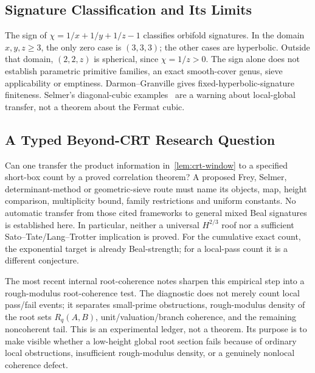 \documentclass[11pt,a4paper]{article}
\begin{document}
\subsection{Signature Classification and Its Limits}
\label{sec:outlook-phase}

The sign of $\chi=1/x+1/y+1/z-1$ classifies orbifold signatures.
In the domain $x,y,z\ge3$, the only zero case is $(3,3,3)$;
the other cases are hyperbolic. Outside that domain,
$(2,2,z)$ is spherical, since $\chi=1/z>0$.
The sign alone does not establish parametric primitive families,
an exact smooth-cover genus, sieve applicability or emptiness.
Darmon--Granville gives fixed-hyperbolic-signature finiteness.
Selmer's diagonal-cubic examples~\cite{Selmer1951} are a warning
about local-global transfer, not a theorem about the Fermat cubic.

\subsection{A Typed Beyond-CRT Research Question}
\label{sec:outlook-rqprime}

Can one transfer the product information in~\cref{lem:crt-window}
to a specified short-box count by a proved correlation theorem?
A proposed Frey, Selmer, determinant-method or geometric-sieve route
\cite{BS2015,Bhargava2014,HeathBrown2002,KoymansSmith2024}
must name its objects, map, height comparison, multiplicity bound,
family restrictions and uniform constants. No automatic transfer
from those cited frameworks to general mixed Beal signatures is
established here. In particular, neither a universal $H^{2/3}$ roof
nor a sufficient Sato--Tate/Lang--Trotter implication is proved.
For the cumulative exact count, the exponential target is already
Beal-strength; for a local-pass count it is a different conjecture.

The most recent internal root-coherence notes sharpen this empirical
step into a rough-modulus root-coherence test. The diagnostic does not
merely count local pass/fail events; it separates small-prime
obstructions, rough-modulus density of the root sets $R_q(A,B)$,
unit/valuation/branch coherence, and the remaining noncoherent tail.
This is an experimental ledger, not a theorem. Its purpose is to make
visible whether a low-height global root section fails because of
ordinary local obstructions, insufficient rough-modulus density, or a
genuinely nonlocal coherence defect.
\end{document}
